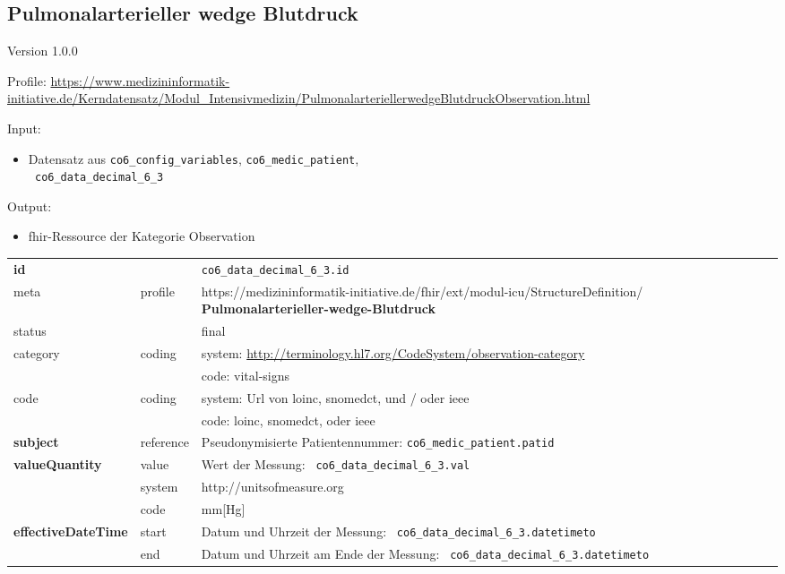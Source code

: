 \subsection{
Pulmonalarterieller wedge Blutdruck} 
\noindent Version 1.0.0

\noindent Profile: \url{https://www.medizininformatik-initiative.de/Kerndatensatz/Modul_Intensivmedizin/PulmonalarteriellerwedgeBlutdruckObservation.html}

\noindent Input:
\begin{itemize}
	\item Datensatz aus \texttt{co6\_config\_variables}, \texttt{co6\_medic\_patient}, \\ \texttt{
co6\_data\_decimal\_6\_3}
\end{itemize}
Output:
\begin{itemize}
        \item \ac{fhir}-Ressource der Kategorie \glqq Observation\grqq{}
\end{itemize}
\begin{longtable}{|l|l|p{7.5cm}|}
        \hline
        \rowcolor{lightgray} \multicolumn{3}{|l|}{Data Mapping (inhaltlich)} \\ \hline
        \textbf{id} &  & \texttt{co6\_data\_decimal\_6\_3.id} \\ \hline
	meta & profile & https://medizininformatik-initiative.de/fhir/ext/modul-icu/StructureDefinition/\textbf{
Pulmonalarterieller-wedge-Blutdruck} \\ \hline 
	status &  & final   \\ \hline 
	category & coding & system: \url{http://terminology.hl7.org/CodeSystem/observation-category} \\
\cline{3-3}
	& & code: vital-signs\\ \hline
	code & coding & system: Url von \ac{loinc}, \ac{snomedct}, und / oder \ac{ieee} \\ 
	\cline{3-3} 
	 &  & code: \ac{loinc}, \ac{snomedct}, oder \ac{ieee} \\ \hline
	 \textbf{subject}  & reference & Pseudonymisierte Patientennummer: \texttt{co6\_medic\_patient.patid} \\ \hline
	 \textbf{valueQuantity}  & value & Wert der Messung: \texttt{
co6\_data\_decimal\_6\_3.val} \\
        \cline{2-3}
         & system & http://unitsofmeasure.org \\
         \cline{2-3}
         & code & mm[Hg] \\ \hline
     \textbf{effectiveDateTime}  & start & Datum und Uhrzeit der Messung: \texttt{
co6\_data\_decimal\_6\_3.datetimeto} \\
    \cline{2-3}
     & end & Datum und Uhrzeit am Ende der Messung: \texttt{
co6\_data\_decimal\_6\_3.datetimeto} \\ \hline
\end{longtable}


